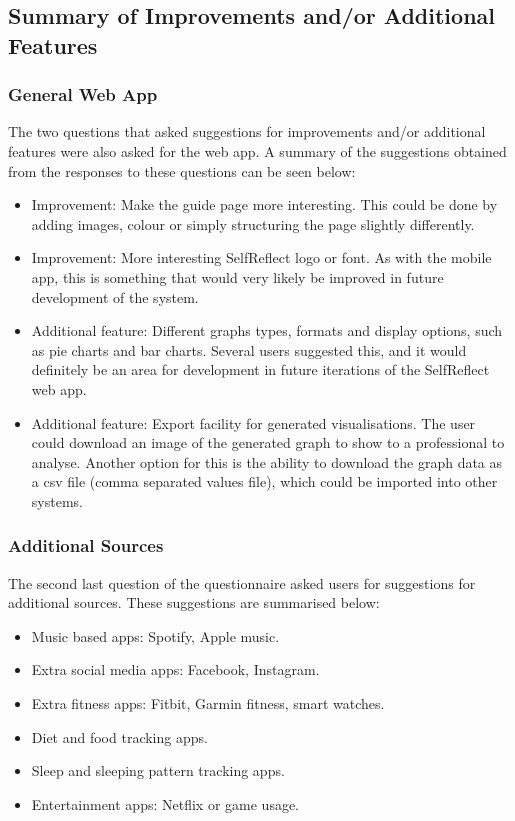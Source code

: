 \documentclass[11pt,openright,a4paper]{report}
\begin{document}
\subsection{Summary of Improvements and/or Additional Features} \label{subsec:addsources}
\subsubsection{General Web App}
The two questions that asked suggestions for improvements and/or additional features were also asked for the web app. A summary of the suggestions obtained from the responses to these questions can be seen below:
\begin{itemize}
\item Improvement: Make the guide page more interesting. This could be done by adding images, colour or simply structuring the page slightly differently.
\item Improvement: More interesting SelfReflect logo or font. As with the mobile app, this is something that would very likely be improved in future development of the system.
\item Additional feature: Different graphs types, formats and display options, such as pie charts and bar charts. Several users suggested this, and it would definitely be an area for development in future iterations of the SelfReflect web app.
\item Additional feature: Export facility for generated visualisations. The user could download an image of the generated graph to show to a professional to analyse. Another option for this is the ability to download the graph data as a csv file (comma separated values file), which could be imported into other systems.
\end{itemize}

\subsubsection{Additional Sources}
The second last question of the questionnaire asked users for suggestions for additional sources. These suggestions are summarised below:
\begin{itemize}
\item Music based apps: Spotify, Apple music.
\item Extra social media apps: Facebook, Instagram.
\item Extra fitness apps: Fitbit, Garmin fitness, smart watches.
\item Diet and food tracking apps.
\item Sleep and sleeping pattern tracking apps.
\item Entertainment apps: Netflix or game usage.
\end{itemize}
\end{document}
